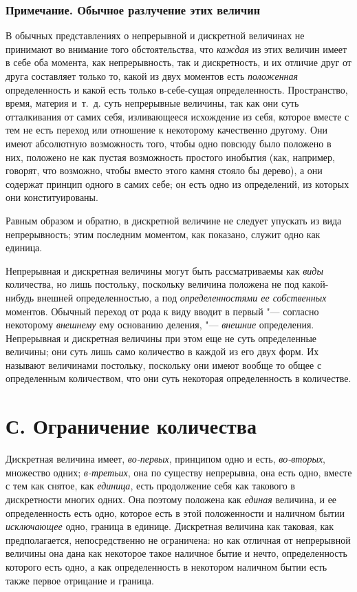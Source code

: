 \subsubsection[Примечание. Обычное разлучение этих величин]
{Примечание. Обычное разлучение этих величин}

В обычных представлениях о непрерывной и дискретной величинах не принимают
во внимание того обстоятельства, что {\em каждая} из
этих величин имеет в себе оба момента, как непрерывность, так и
дискретность, и их отличие друг от друга составляет только то, какой из
двух моментов есть {\em положенная} определенность и
какой есть только в-себе-сущая определенность. Пространство, время, материя
и~т.~д. суть непрерывные величины, так как они суть отталкивания от самих
себя, изливающееся исхождение из себя, которое вместе с тем не есть переход
или отношение к некоторому качественно другому. Они имеют абсолютную
возможность того, чтобы одно повсюду было положено в них, положено не как
пустая возможность простого инобытия (как, например, говорят, что возможно,
чтобы вместо этого камня стояло бы дерево), а они содержат принцип одного в
самих себе; он есть одно из определений, из которых они конституированы.

Равным образом и обратно, в дискретной величине не следует упускать из вида
непрерывность; этим последним моментом, как показано, служит одно как единица.

Непрерывная и дискретная величины могут быть рассматриваемы как
{\em виды} количества, но лишь постольку, поскольку
величина положена не под какой-нибудь внешней определенностью, а под
{\em определенностями ее собственных} моментов. Обычный
переход от рода к виду вводит в первый "--- согласно некоторому
{\em внешнему} ему основанию деления, "---
{\em внешние} определения. Непрерывная и дискретная
величины при этом еще не суть определенные величины; они суть лишь само
количество в каждой из его двух форм. Их называют величинами постольку,
поскольку они имеют вообще то общее с определенным количеством, что они
суть некоторая определенность в количестве.

\section[С. Ограничение количества]{С. Ограничение количества}
Дискретная величина имеет, {\em во-первых}, принципом
одно и есть, {\em во-вторых}, множество одних;
{\em в-третьих}, она по существу непрерывна, она есть
одно, вместе с тем как снятое, как {\em единица}, есть
продолжение себя как такового в дискретности многих одних. Она поэтому
положена как {\em единая} величина, и ее определенность
есть одно, которое есть в этой положенности и наличном бытии
{\em исключающее} одно, граница в единице. Дискретная
величина как таковая, как предполагается, непосредственно не ограничена: но
как отличная от непрерывной величины она дана как некоторое такое наличное
бытие и нечто, определенность которого есть одно, а как определенность в
некотором наличном бытии есть также первое отрицание и граница.

